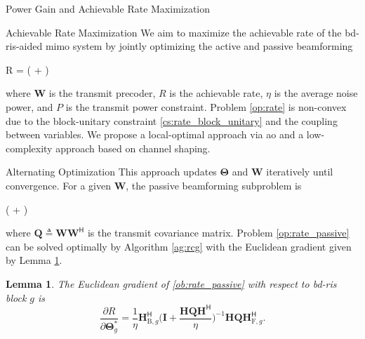 \documentclass[journal]{IEEEtran}
\newtheorem{lemma}{Lemma}
\begin{document}
\begin{section}{Power Gain and Achievable Rate Maximization}
	\begin{subsection}{Achievable Rate Maximization}\label{sc:rate}
		We aim to maximize the achievable rate of the \gls{bd}-\gls{ris}-aided \gls{mimo} system by jointly optimizing the active and passive beamforming
		\begin{maxi!}
			{}{R = \log \det \biggl( + \biggr)}{\label{op:rate}}{\label{ob:rate}}
		\end{maxi!}
		where $\mathbf{W}$ is the transmit precoder, $R$ is the achievable rate, $\eta$ is the average noise power, and $P$ is the transmit power constraint.
		Problem \eqref{op:rate} is non-convex due to the block-unitary constraint \eqref{cs:rate_block_unitary} and the coupling between variables.
		We propose a local-optimal approach via \gls{ao} and a low-complexity approach based on channel shaping.

		\begin{subsubsection}{Alternating Optimization}
			This approach updates $\mathbf{\Theta}$ and $\mathbf{W}$ iteratively until convergence.
			For a given $\mathbf{W}$, the passive beamforming subproblem is
			\begin{maxi!}
				{\scriptstyle{\mathbf{\Theta}}}{\log \det \biggl( + \biggr)}{\label{op:rate_passive}}{\label{ob:rate_passive}}
				\addConstraint{\mathbf{\Theta}_g^\mathsf{H} \mathbf{\Theta}_g=\mathbf{I}, \quad \forall g,}{}{}
			\end{maxi!}
			where $\mathbf{Q} \triangleq \mathbf{W} \mathbf{W}^\mathsf{H}$ is the transmit covariance matrix.
			Problem \eqref{op:rate_passive} can be solved optimally by Algorithm \ref{ag:rcg} with the Euclidean gradient given by Lemma \ref{lm:rate_gradient}.
			\begin{lemma}\label{lm:rate_gradient}
				The Euclidean gradient of \eqref{ob:rate_passive} with respect to \gls{bd}-\gls{ris} block $g$ is
				\begin{equation}
					\frac{\partial R}{\partial \mathbf{\Theta}_g^*} = \frac{1}{\eta} \mathbf{H}_{\mathrm{B},g}^\mathsf{H} \biggl(\mathbf{I} + \frac{\mathbf{H}\mathbf{Q}\mathbf{H}^\mathsf{H}}{\eta}\biggr)^{-1} \mathbf{H} \mathbf{Q} \mathbf{H}_{\mathrm{F},g}^\mathsf{H}.
					\label{eq:rate_gradient}
				\end{equation}
			\end{lemma}


\end{subsubsection}
\end{subsection}
\end{section}
\end{document}
